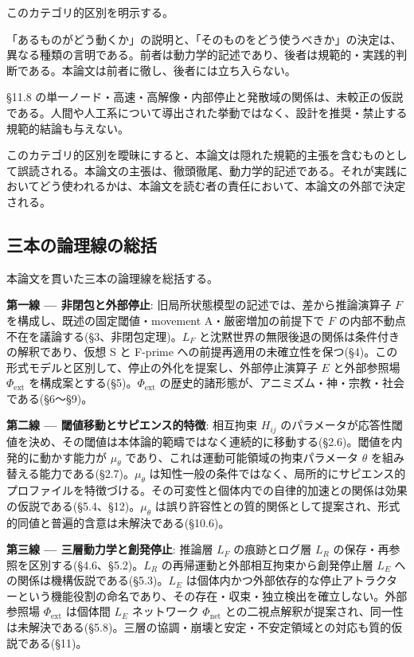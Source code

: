 このカテゴリ的区別を明示する。

「あるものがどう動くか」の説明と、「そのものをどう使うべきか」の決定は、異なる種類の言明である。前者は動力学的記述であり、後者は規範的・実践的判断である。本論文は前者に徹し、後者には立ち入らない。

\S{}11.8 の単一ノード・高速・高解像・内部停止と発散域の関係は、未較正の仮説である。人間や人工系について導出された挙動ではなく、設計を推奨・禁止する規範的結論も与えない。

このカテゴリ的区別を曖昧にすると、本論文は隠れた規範的主張を含むものとして誤読される。本論文の主張は、徹頭徹尾、動力学的記述である。それが実践においてどう使われるかは、本論文を読む者の責任において、本論文の外部で決定される。

\bigskip


\subsection{三本の論理線の総括}


本論文を貫いた三本の論理線を総括する。

\textbf{第一線 — 非閉包と外部停止}:
旧局所状態模型の記述では、差から推論演算子 $F$ を構成し、既述の固定閾値・movement A・厳密増加の前提下で $F$ の内部不動点不在を議論する(\S{}3、非閉包定理)。$L_F$ と沈黙世界の無限後退の関係は条件付きの解釈であり、仮想 S と F-prime への前提再適用の未確立性を保つ(\S{}4)。この形式モデルと区別して、停止の外化を提案し、外部停止演算子 $E$ と外部参照場 $\Phi_{\text{ext}}$ を構成案とする(\S{}5)。$\Phi_{\text{ext}}$ の歴史的諸形態が、アニミズム・神・宗教・社会である(\S{}6〜\S{}9)。

\textbf{第二線 — 閾値移動とサピエンス的特徴}:
相互拘束 $H_{ij}$ のパラメータが応答性閾値を決め、その閾値は本体論的範疇ではなく連続的に移動する(\S{}2.6)。閾値を内発的に動かす能力が $\mu_\theta$ であり、これは運動可能領域の拘束パラメータ $\theta$ を組み替える能力である(\S{}2.7)。$\mu_\theta$ は知性一般の条件ではなく、局所的にサピエンス的プロファイルを特徴づける。その可変性と個体内での自律的加速との関係は効果の仮説である(\S{}5.4、\S{}12)。$\mu_\theta$ は誤り許容性との質的関係として提案され、形式的同値と普遍的含意は未解決である(\S{}10.6)。

\textbf{第三線 — 三層動力学と創発停止}:
推論層 $L_F$ の痕跡とログ層 $L_R$ の保存・再参照を区別する(\S{}4.6、\S{}5.2)。$L_R$ の再帰運動と外部相互拘束から創発停止層 $L_E$ への関係は機構仮説である(\S{}5.3)。$L_E$ は個体内かつ外部依存的な停止アトラクターという機能役割の命名であり、その存在・収束・独立検出を確立しない。外部参照場 $\Phi_{\text{ext}}$ は個体間 $L_E$ ネットワーク $\Phi_{\text{net}}$ との二視点解釈が提案され、同一性は未解決である(\S{}5.8)。三層の協調・崩壊と安定・不安定領域との対応も質的仮説である(\S{}11)。

